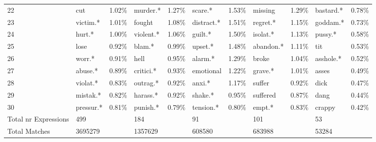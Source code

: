 \begin{tabular}{lllllllllll}
22                   &              cut &     1.02\% &           murder.* &           1.27\% &      scare.* &     1.53\% &       missing &     1.29\% &        bastard.* &            0.78\% \\
23                   &         victim.* &     1.01\% &             fought &           1.08\% &   distract.* &     1.51\% &      regret.* &     1.15\% &         goddam.* &            0.73\% \\
24                   &           hurt.* &     1.00\% &          violent.* &           1.06\% &      guilt.* &     1.50\% &      isolat.* &     1.13\% &          pussy.* &            0.58\% \\
25                   &             lose &     0.92\% &             blam.* &           0.99\% &      upset.* &     1.48\% &     abandon.* &     1.11\% &              tit &            0.53\% \\
26                   &           worr.* &     0.91\% &               hell &           0.95\% &      alarm.* &     1.29\% &         broke &     1.04\% &        asshole.* &            0.52\% \\
27                   &          abuse.* &     0.89\% &          critici.* &           0.93\% &    emotional &     1.22\% &       grave.* &     1.01\% &            asses &            0.49\% \\
28                   &         violat.* &     0.83\% &           outrag.* &           0.92\% &       anxi.* &     1.17\% &        suffer &     0.92\% &             dick &            0.47\% \\
29                   &         mistak.* &     0.82\% &           harass.* &           0.92\% &      shake.* &     0.95\% &      suffered &     0.87\% &             dang &            0.44\% \\
30                   &        pressur.* &     0.81\% &           punish.* &           0.79\% &    tension.* &     0.80\% &        empt.* &     0.83\% &           crappy &            0.42\% \\
Total nr Expressions &              499 &            &                184 &                  &           91 &            &           101 &            &               53 &                   \\
Total Matches        &          3695279 &            &            1357629 &                  &       608580 &            &        683988 &            &            53284 &                   \\
\bottomrule
\end{tabular}
